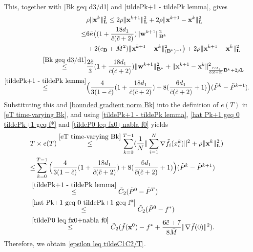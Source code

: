 \documentclass[12pt,draftcls,onecolumn]{IEEEtran}
\begin{document}
This, together with \eqref{Bk geq d3/d1} and \eqref{tildePk+1 - tildePk lemma}, gives
\begin{align}
	&\rho\|\mathbf{x}^{k}\|^2_\mathbf{L}\leq 2\rho\|\mathbf{x}^{k+1}\|^2_\mathbf{L}+2\rho\|\mathbf{x}^{k+1}-\mathbf{x}^k\|^2_\mathbf{L}\notag\\
	\leq & 6\tilde{\kappa}\big((1+\frac{18d_1}{\tilde{c}(\tilde{c}+2)})\|\mathbf{w}^{k+1}\|^2_{\mathbf{B}^k}\notag\\
    &+2(c_{\mathbf{B}}+\bar{M}^2)\|\mathbf{x}^{k+1}-\mathbf{x}^k\|^2_{(\mathbf{B}^k)^{-1}}\big)+2\rho\|\mathbf{x}^{k+1}-\mathbf{x}^k\|^2_\mathbf{L}\notag\\
	\overset{\eqref{Bk geq d3/d1}}{\leq} & \frac{2\tilde{c}}{3}(1+\frac{18d_1}{\tilde{c}(\tilde{c}+2)})\|\mathbf{w}^{k+1}\|^2_{\mathbf{B}^k}+\|\mathbf{x}^{k+1}-\mathbf{x}^k\|^2_{\frac{12d_1}{\tilde{c}(\tilde{c}+2)}\mathbf{B}^k+2\rho \mathbf{L}}\notag\\
	\overset{\eqref{tildePk+1 - tildePk lemma}}{\leq}& \Big(\frac{4}{3(1-\tilde{c})}(1+\frac{18d_1}{\tilde{c}(\tilde{c}+2)})+8(\frac{6d_1}{\tilde{c}(\tilde{c}+2)}+1)\Big)(\tilde{P}^k-\tilde{P}^{k+1}).\notag
\end{align}
Substituting this and \eqref{bounded gradient norm Bk} into the definition of $e(T)$ in \eqref{eT time-varying Bk}, and using \eqref{tildePk+1 - tildePk lemma}, \eqref{hat Pk+1 geq 0 tildePk+1 geq f*} and \eqref{tildeP0 leq fx0+nabla f0} yields
\begin{align}
	&T\times e(T)\overset{\eqref{eT time-varying Bk}}{\leq} \sum_{k=0}^{T-1}(\frac{1}{N}\|\sum_{i=1}^N \nabla \tilde{f}_i(x_i^k)\|^2 + \rho\|\mathbf{x}^{k}\|^2_\mathbf{L}) \notag\\
	&{\leq}  \sum_{k=0}^{T-1}\Big(\frac{4}{3(1-\tilde{c})}(1+\frac{18d_1}{\tilde{c}(\tilde{c}+2)})+8(\frac{6d_1}{\tilde{c}(\tilde{c}+2)}+1)\Big)(\tilde{P}^k-\tilde{P}^{k+1})\notag\\
	&\overset{\eqref{tildePk+1 - tildePk lemma}}{\leq} \tilde{C}_2(\tilde{P}^0-\tilde{P}^{T})\notag\\
    &\overset{\eqref{hat Pk+1 geq 0 tildePk+1 geq f*}}{\leq} \tilde{C}_2(\tilde{P}^0-f^*)\notag\\
	&\overset{\eqref{tildeP0 leq fx0+nabla f0}}{\leq} \tilde{C}_2(\tilde{f}(\mathbf{x}^0)-f^*+\frac{6\tilde{c}+7}{8\bar{M}}\|\nabla \tilde{f}(0)\|^2).  \label{T times eT Bk} 
\end{align}
Therefore, we obtain \eqref{epsilon leq tildeC1C2/T}.

\end{document}
